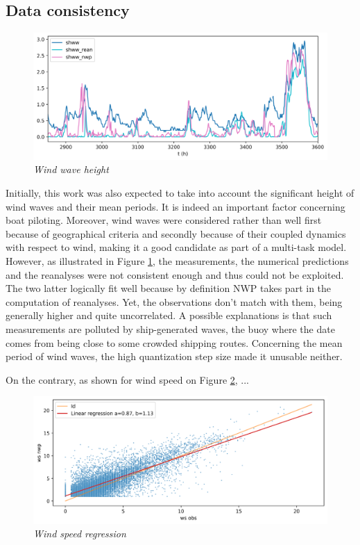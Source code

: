 \documentclass{article}
\newcommand{\saut}{\vspace{10px}}
\begin{document}
\subsection*{Data consistency}

\begin{figure}[H]
    \centering
    \includegraphics[width=.95\linewidth]{img/shww.png}
    \caption{\textit{Wind wave height}}
   \label{shww}
\end{figure}

Initially, this work was also expected to take into account the significant height of wind waves and their mean periods.
It is indeed an important factor concerning boat piloting. Moreover, wind waves were considered rather than well
first because of geographical criteria and secondly because of their coupled dynamics with respect to wind, making it
a good candidate as part of a multi-task model. However, as illustrated in Figure \ref{shww}, the measurements, the
numerical predictions and the reanalyses were not consistent enough and thus could not be exploited. The two
latter logically fit well because by definition NWP takes part in the computation of reanalyses. Yet, the observations
don't match with them, being generally higher and quite uncorrelated. A possible explanations is that such measurements
are polluted by ship-generated waves, the buoy where the date comes from being close to some crowded shipping
routes. Concerning the mean period of wind waves, the high quantization step size made it unusable neither.

\saut

On the contrary, as shown for wind speed on Figure \ref{ws_straight}, ...

\begin{figure}[H]
    \centering
    \includegraphics[width=\linewidth]{img/ws_compare.png}
    \caption{\textit{Wind speed regression}}
   \label{ws_straight}
\end{figure}
\end{document}
